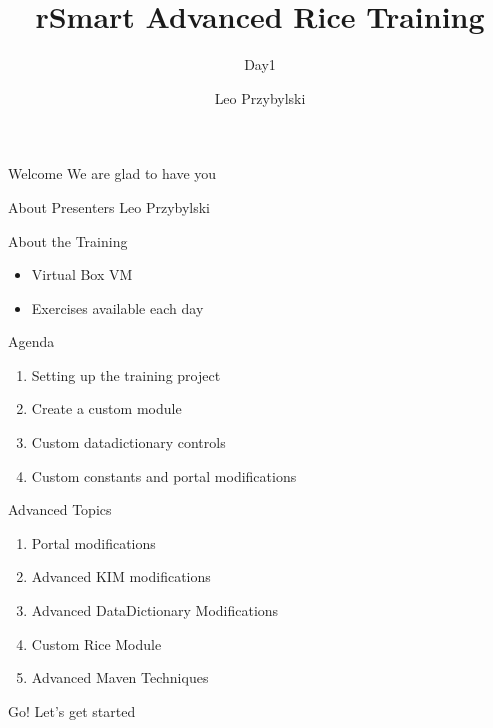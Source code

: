 \documentclass[xcolor=dvipsnames,14pt]{beamer}
\begin{document}
\title[A short proof]{rSmart Advanced Rice Training}
\subtitle[Errors]{Day1}
\author[Leo]{Leo Przybylski }



\begin{frame}[plain]
  \titlepage
\end{frame}

\begin{frame}{Welcome}
  We are glad to have you
\end{frame}

\begin{frame}{About Presenters}
  Leo Przybylski
  
\end{frame}

\begin{frame}{About the Training}
  \begin{itemize}
    \item Virtual Box VM
    \item Exercises available each day
  \end{itemize}
  
\end{frame}

\begin{frame}{Agenda}
  \begin{enumerate}
    \item Setting up the training project
    \item Create a custom module
    \item Custom datadictionary controls
    \item Custom constants and portal modifications
  \end{enumerate}
\end{frame}

\begin{frame}{Advanced Topics}
  \begin{enumerate}
    \item Portal modifications
    \item Advanced KIM modifications
    \item Advanced DataDictionary Modifications
    \item Custom Rice Module
    \item Advanced Maven Techniques
  \end{enumerate}
\end{frame}

\begin{frame}{Go!}
Let's get started
\end{frame}
\end{document}
